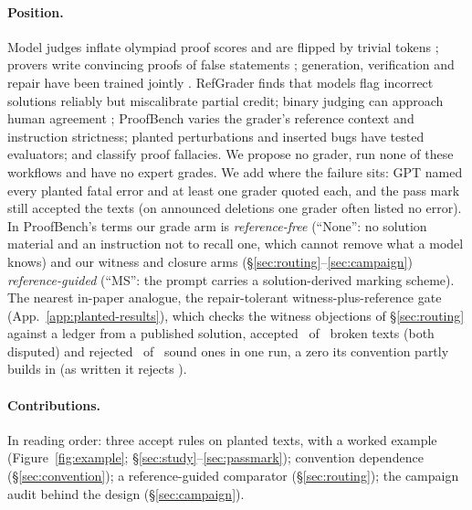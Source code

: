 \documentclass{article}
\begin{document}
\paragraph{Position.} Model judges inflate olympiad proof scores \mbox{\citep{petrov2025proof}} and are flipped by trivial tokens \mbox{\citep{zhao2025onetoken}}; provers write convincing proofs of false statements \mbox{\citep{petrov2025brokenmath}}; generation, verification and repair have been trained jointly \mbox{\citep{chen2026maxproof}}. RefGrader \mbox{\citep{mahdavi2025refgrader}} finds that models flag incorrect solutions reliably but miscalibrate partial credit; binary judging can approach human agreement \mbox{\citep{dekoninck2025opc}}; ProofBench \mbox{\citep{ma2025reliable}} varies the grader's reference context and instruction strictness; planted perturbations \mbox{\citep{doddapaneni2024fbi}} and inserted bugs \mbox{\citep{mcaleese2024criticgpt}} have tested evaluators; and \mbox{\citet{mahdavi2025brains}} classify proof fallacies. We propose no grader, run none of these workflows and have no expert grades. We add where the failure sits: GPT named every planted fatal error and at least one grader quoted each, and the pass mark still accepted the texts (on announced deletions one grader often listed no error). In ProofBench's terms our grade arm is \emph{reference-free} (``None'': no solution material and an instruction not to recall one, which cannot remove what a model knows) and our witness and closure arms (\S\ref{sec:routing}--\ref{sec:campaign}) \emph{reference-guided} (``MS'': the prompt carries a solution-derived marking scheme). The nearest in-paper analogue, the repair-tolerant witness-plus-reference gate (App.~\ref{app:planted-results}), which checks the witness objections of \S\ref{sec:routing} against a ledger from a published solution, accepted \CRRefWitBrokenAccP\ of \CRNBroken\ broken texts (both disputed) and rejected \CRRefWitSoundRejP\ of \CRNSound\ sound ones in one run, a zero its convention partly builds in (as written it rejects \CRRefWitAWSoundRejP).

\paragraph{Contributions.} In reading order: three accept rules on planted texts, with a worked example (Figure~\ref{fig:example}; \S\ref{sec:study}--\ref{sec:passmark}); convention dependence (\S\ref{sec:convention}); a reference-guided comparator (\S\ref{sec:routing}); the campaign audit behind the design (\S\ref{sec:campaign}).
\end{document}
